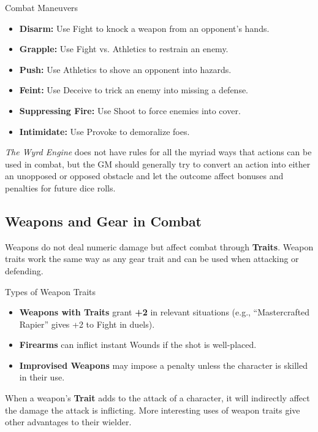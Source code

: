 \begin{DndReadAloud}{Combat Maneuvers}
\begin{itemize}
    \item \textbf{Disarm:} Use Fight to knock a weapon from an opponent’s hands.
    \item \textbf{Grapple:} Use Fight vs. Athletics to restrain an enemy.
    \item \textbf{Push:} Use Athletics to shove an opponent into hazards.
    \item \textbf{Feint:} Use Deceive to trick an enemy into missing a defense.
    \item \textbf{Suppressing Fire:} Use Shoot to force enemies into cover.
    \item \textbf{Intimidate:} Use Provoke to demoralize foes.
\end{itemize}
\end{DndReadAloud}

\emph{The Wyrd Engine} does not have rules for all the myriad ways that actions can be used in combat, but the GM should generally try to convert an action into either an unopposed or opposed obstacle and let the outcome affect bonuses and penalties for future dice rolls.

\subsection{Weapons and Gear in Combat}
Weapons do not deal numeric damage but affect combat through \textbf{Traits}. Weapon traits work the same way as any gear trait and can be used when attacking or defending.

\begin{DndReadAloud}{Types of Weapon Traits}
\begin{itemize}
    \item \textbf{Weapons with Traits} grant \textbf{+2} in relevant situations (e.g., “Mastercrafted Rapier” gives +2 to Fight in duels).
    \item \textbf{Firearms} can inflict instant Wounds if the shot is well-placed.
    \item \textbf{Improvised Weapons} may impose a penalty unless the character is skilled in their use.
\end{itemize}
\end{DndReadAloud}

When a weapon's \textbf{Trait} adds to the attack of a character, it will indirectly affect the damage the attack is inflicting. More interesting uses of weapon traits give other advantages to their wielder.

